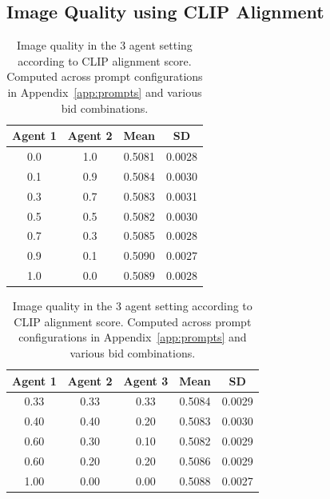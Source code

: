 \documentclass[format=acmsmall, review=false]{acmart}
\begin{document}
\newpage
\subsection{Image Quality using CLIP Alignment}
\label{app:clip-alignment}

\begin{table}[htb]
\centering
\begin{minipage}{1\textwidth}
\centering
\caption{Image quality in the 2 agent setting according to CLIP alignment score. Computed across prompt configurations in Appendix~\ref{app:prompts} and various bid combinations.}
\label{tab:image_quality_2_agent}
\begin{tabular}{cccc}
\hline
Agent 1 & Agent 2 & Mean & SD \\
\hline
0.0 & 1.0 & 0.5081 & 0.0028 \\
0.1 & 0.9 & 0.5084 & 0.0030 \\
0.3 & 0.7 & 0.5083 & 0.0031 \\
0.5 & 0.5 & 0.5082 & 0.0030 \\
0.7 & 0.3 & 0.5085 & 0.0028 \\
0.9 & 0.1 & 0.5090 & 0.0027 \\
1.0 & 0.0 & 0.5089 & 0.0028 \\
\hline
\end{tabular}
\end{minipage}
\hfill
\vspace{1cm}
\begin{minipage}{1\textwidth}
\centering
\caption{Image quality in the 3 agent setting according to CLIP alignment score. Computed across prompt configurations in Appendix~\ref{app:prompts}  and various bid combinations.}
\label{tab:image_quality_3_agent}
\begin{tabular}{ccccc}
\hline
Agent 1 & Agent 2 & Agent 3 & Mean & SD \\
\hline
0.33 & 0.33 & 0.33 & 0.5084 & 0.0029 \\
0.40 & 0.40 & 0.20 & 0.5083 & 0.0030 \\
0.60 & 0.30 & 0.10 & 0.5082 & 0.0029 \\
0.60 & 0.20 & 0.20 & 0.5086 & 0.0029 \\
1.00 & 0.00 & 0.00 & 0.5088 & 0.0027 \\
\hline
\end{tabular}
\end{minipage}
\end{table}
\end{document}
